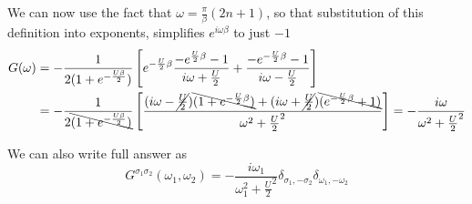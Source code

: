 We can now use the fact that $\omega = \frac{\pi}{\beta}(2n+1)$,
 so that substitution of this definition into exponents, simplifies $e^{i\omega\beta}$ to just $-1$
\begin{equation}\begin{aligned}
 G(\omega) & = -\frac{1}{2(1+e^{-\frac{U\beta}{2}})}\left[
    e^{-\frac{U}{2}\beta} \frac{-e^{\frac{U}{2}\beta}-1}{i\omega+\frac{U}{2}} + \frac{-e^{-\frac{U}{2}\beta}-1}{i\omega-\frac{U}{2}}
  \right] \\
  & = - \frac{1}{2\bcancel{(1+e^{-\frac{U\beta}{2}})}}\left[
    \frac{(i\omega-\cancel{\frac{U}{2}})\bcancel{(1+e^{-\frac{U}{2}\beta})}+(i\omega+\cancel{\frac{U}{2}})\bcancel{(e^{-\frac{U}{2}\beta}+1)}}{\omega^2+\frac{U}{2}^2}
  \right] = -\frac{i\omega}{\omega^2+\frac{U}{2}^2}
\end{aligned}\end{equation}
 
We can also write full answer as
\begin{equation}
 G^{\sigma_1\sigma_2}(\omega_1,\omega_2) = -\frac{i\omega_1}{\omega_1^2+\frac{U}{2}^2}\delta_{\sigma_1,-\sigma_2}\delta_{\omega_1,-\omega_2}
\end{equation}


